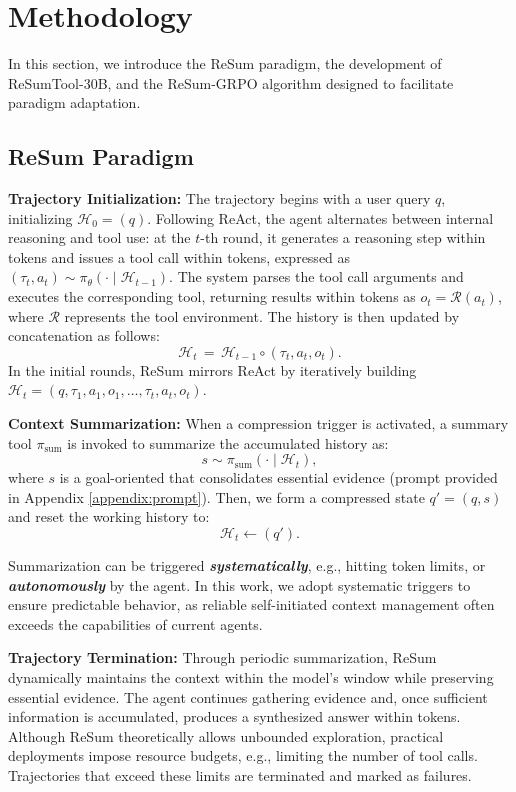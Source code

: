 \section{Methodology}

In this section, we introduce the ReSum paradigm, the development of ReSumTool-30B, and the ReSum-GRPO algorithm designed to facilitate paradigm adaptation.

\subsection{ReSum Paradigm}
\textbf{Trajectory Initialization:} The trajectory begins with a user query $q$, initializing $\mathcal{H}_0 = (q)$. Following ReAct, the agent alternates between internal reasoning and tool use: at the $t$-th round, it generates a reasoning step within \think{} tokens and issues a tool call within \search{} tokens, expressed as $(\tau_t, a_t) \sim \pi_{\theta}(\cdot \mid \mathcal{H}_{t-1})$. The system parses the tool call arguments and executes the corresponding tool, returning results within \response{} tokens as $o_t = \mathcal{R}(a_t)$, where $\mathcal{R}$ represents the tool environment. The history is then updated by concatenation as follows:
\[
\mathcal{H}_t \,=\, \mathcal{H}_{t-1} \circ (\tau_t, a_t, o_t).
\]
In the initial rounds, ReSum mirrors ReAct by iteratively building $\mathcal{H}_t = \left( q, \tau_1, a_1, o_1, \ldots, \tau_t, a_t, o_t \right)$.

\textbf{Context Summarization:} When a compression trigger is activated, a summary tool $\pi_{\text{sum}}$ is invoked to summarize the accumulated history as:
\[
s \sim \pi_{\text{sum}}(\cdot \mid \mathcal{H}_t),
\]
where $s$ is a goal-oriented \textbf{\summary{}} that consolidates essential evidence (prompt provided in Appendix \ref{appendix:prompt}). Then, we form a compressed state $q' = (q, s)$ and reset the working history to:
\[
\mathcal{H}_t \leftarrow (q').
\]

Summarization can be triggered \emph{\textbf{systematically}}, e.g., hitting token limits, or \emph{\textbf{autonomously}} by the agent. In this work, we adopt systematic triggers to ensure predictable behavior, as reliable self-initiated context management often exceeds the capabilities of current agents.

\textbf{Trajectory Termination:} Through periodic summarization, ReSum dynamically maintains the context within the model's window while preserving essential evidence. The agent continues gathering evidence and, once sufficient information is accumulated, produces a synthesized answer within \answer{} tokens. Although ReSum theoretically allows unbounded exploration, practical deployments impose resource budgets, e.g., limiting the number of tool calls. Trajectories that exceed these limits are terminated and marked as failures.

